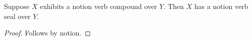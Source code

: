 

\begin{proposition}\label{notion_verb_compound_alias_projection}
    Suppose $X$ exhibits a notion verb compound over $Y$.
    Then $X$ has a notion verb seal over $Y$.
\end{proposition}
\begin{proof}
    Follows by notion.
\end{proof}
